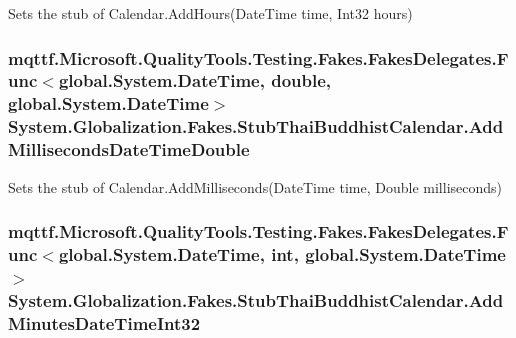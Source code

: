 Sets the stub of Calendar.\-Add\-Hours(\-Date\-Time time, Int32 hours)

\hypertarget{class_system_1_1_globalization_1_1_fakes_1_1_stub_thai_buddhist_calendar_a318ae798eeb6a29fedf55149bc8f1705}{
\subsubsection[{Add\-Milliseconds\-Date\-Time\-Double}]{\setlength{\rightskip}{0pt plus 5cm}mqttf.\-Microsoft.\-Quality\-Tools.\-Testing.\-Fakes.\-Fakes\-Delegates.\-Func$<$global.\-System.\-Date\-Time, double, global.\-System.\-Date\-Time$>$ System.\-Globalization.\-Fakes.\-Stub\-Thai\-Buddhist\-Calendar.\-Add\-Milliseconds\-Date\-Time\-Double}}\label{class_system_1_1_globalization_1_1_fakes_1_1_stub_thai_buddhist_calendar_a318ae798eeb6a29fedf55149bc8f1705}


Sets the stub of Calendar.\-Add\-Milliseconds(\-Date\-Time time, Double milliseconds)

\hypertarget{class_system_1_1_globalization_1_1_fakes_1_1_stub_thai_buddhist_calendar_aa240831fea42e1d9b2701504898e7b9d}{
\subsubsection[{Add\-Minutes\-Date\-Time\-Int32}]{\setlength{\rightskip}{0pt plus 5cm}mqttf.\-Microsoft.\-Quality\-Tools.\-Testing.\-Fakes.\-Fakes\-Delegates.\-Func$<$global.\-System.\-Date\-Time, int, global.\-System.\-Date\-Time$>$ System.\-Globalization.\-Fakes.\-Stub\-Thai\-Buddhist\-Calendar.\-Add\-Minutes\-Date\-Time\-Int32}}\label{class_system_1_1_globalization_1_1_fakes_1_1_stub_thai_buddhist_calendar_aa240831fea42e1d9b2701504898e7b9d}



